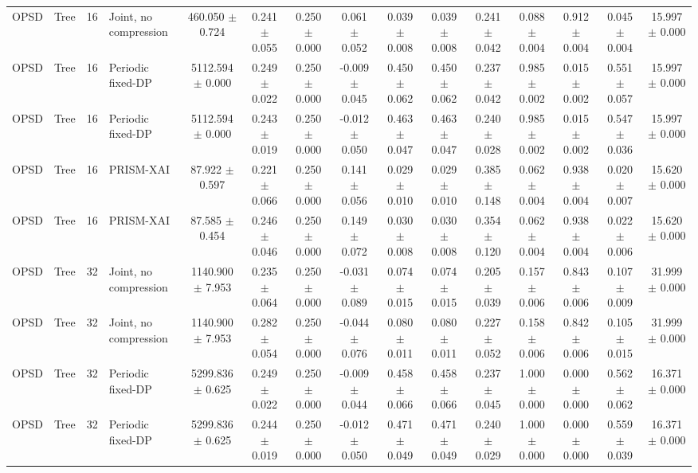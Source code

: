 \begin{table}[t]
\begin{tabular}{llllccccccccccc}
OPSD & Tree & 16 & Joint, no compression & 460.050 $\pm$ 0.724 & 0.241 $\pm$ 0.055 & 0.250 $\pm$ 0.000 & 0.061 $\pm$ 0.052 & 0.039 $\pm$ 0.008 & 0.039 $\pm$ 0.008 & 0.241 $\pm$ 0.042 & 0.088 $\pm$ 0.004 & 0.912 $\pm$ 0.004 & 0.045 $\pm$ 0.004 & 15.997 $\pm$ 0.000 \\
OPSD & Tree & 16 & Periodic fixed-DP & 5112.594 $\pm$ 0.000 & 0.249 $\pm$ 0.022 & 0.250 $\pm$ 0.000 & -0.009 $\pm$ 0.045 & 0.450 $\pm$ 0.062 & 0.450 $\pm$ 0.062 & 0.237 $\pm$ 0.042 & 0.985 $\pm$ 0.002 & 0.015 $\pm$ 0.002 & 0.551 $\pm$ 0.057 & 15.997 $\pm$ 0.000 \\
OPSD & Tree & 16 & Periodic fixed-DP & 5112.594 $\pm$ 0.000 & 0.243 $\pm$ 0.019 & 0.250 $\pm$ 0.000 & -0.012 $\pm$ 0.050 & 0.463 $\pm$ 0.047 & 0.463 $\pm$ 0.047 & 0.240 $\pm$ 0.028 & 0.985 $\pm$ 0.002 & 0.015 $\pm$ 0.002 & 0.547 $\pm$ 0.036 & 15.997 $\pm$ 0.000 \\
OPSD & Tree & 16 & PRISM-XAI & 87.922 $\pm$ 0.597 & 0.221 $\pm$ 0.066 & 0.250 $\pm$ 0.000 & 0.141 $\pm$ 0.056 & 0.029 $\pm$ 0.010 & 0.029 $\pm$ 0.010 & 0.385 $\pm$ 0.148 & 0.062 $\pm$ 0.004 & 0.938 $\pm$ 0.004 & 0.020 $\pm$ 0.007 & 15.620 $\pm$ 0.000 \\
OPSD & Tree & 16 & PRISM-XAI & 87.585 $\pm$ 0.454 & 0.246 $\pm$ 0.046 & 0.250 $\pm$ 0.000 & 0.149 $\pm$ 0.072 & 0.030 $\pm$ 0.008 & 0.030 $\pm$ 0.008 & 0.354 $\pm$ 0.120 & 0.062 $\pm$ 0.004 & 0.938 $\pm$ 0.004 & 0.022 $\pm$ 0.006 & 15.620 $\pm$ 0.000 \\
OPSD & Tree & 32 & Joint, no compression & 1140.900 $\pm$ 7.953 & 0.235 $\pm$ 0.064 & 0.250 $\pm$ 0.000 & -0.031 $\pm$ 0.089 & 0.074 $\pm$ 0.015 & 0.074 $\pm$ 0.015 & 0.205 $\pm$ 0.039 & 0.157 $\pm$ 0.006 & 0.843 $\pm$ 0.006 & 0.107 $\pm$ 0.009 & 31.999 $\pm$ 0.000 \\
OPSD & Tree & 32 & Joint, no compression & 1140.900 $\pm$ 7.953 & 0.282 $\pm$ 0.054 & 0.250 $\pm$ 0.000 & -0.044 $\pm$ 0.076 & 0.080 $\pm$ 0.011 & 0.080 $\pm$ 0.011 & 0.227 $\pm$ 0.052 & 0.158 $\pm$ 0.006 & 0.842 $\pm$ 0.006 & 0.105 $\pm$ 0.015 & 31.999 $\pm$ 0.000 \\
OPSD & Tree & 32 & Periodic fixed-DP & 5299.836 $\pm$ 0.625 & 0.249 $\pm$ 0.022 & 0.250 $\pm$ 0.000 & -0.009 $\pm$ 0.044 & 0.458 $\pm$ 0.066 & 0.458 $\pm$ 0.066 & 0.237 $\pm$ 0.045 & 1.000 $\pm$ 0.000 & 0.000 $\pm$ 0.000 & 0.562 $\pm$ 0.062 & 16.371 $\pm$ 0.000 \\
OPSD & Tree & 32 & Periodic fixed-DP & 5299.836 $\pm$ 0.625 & 0.244 $\pm$ 0.019 & 0.250 $\pm$ 0.000 & -0.012 $\pm$ 0.050 & 0.471 $\pm$ 0.049 & 0.471 $\pm$ 0.049 & 0.240 $\pm$ 0.029 & 1.000 $\pm$ 0.000 & 0.000 $\pm$ 0.000 & 0.559 $\pm$ 0.039 & 16.371 $\pm$ 0.000 \\

\end{tabular}
\end{table}
